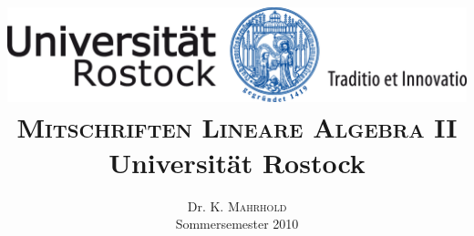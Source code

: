 \documentclass[%
a4paper,
10pt,           %
]
{scrartcl}
\theoremstyle{plain}
\theoremstyle{plain}
\theoremstyle{plain}
\theoremstyle{plain}
\theoremstyle{plain}
\begin{document}
\title{
\includegraphics[scale=0.3]{bilder/uni-logo.png}\\
\textsc{Mitschriften Lineare Algebra II}
\\ Universität Rostock}

\author{Dr. K. \textsc{Mahrhold}\\ Sommersemester 2010}

\begin{titlepage}
\maketitle
\end{titlepage}

\tableofcontents
\end{document}
